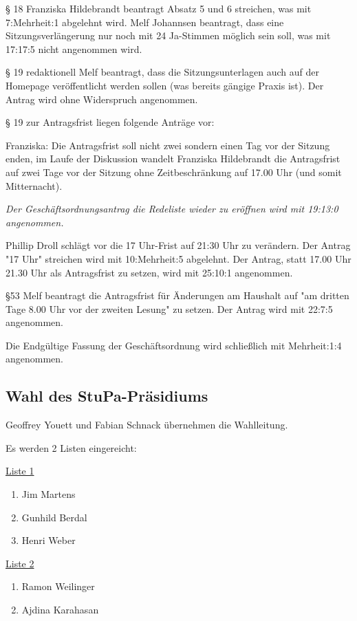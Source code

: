 \documentclass[ngerman,headheight=70pt]{scrartcl}
\begin{document}
    § 18  Franziska Hildebrandt beantragt Absatz 5 und 6 streichen, was mit
    7:Mehrheit:1 abgelehnt wird.
    Melf Johannsen beantragt, dass eine Sitzungsverlängerung nur noch mit 24
    Ja-Stimmen möglich sein soll, was mit 17:17:5 nicht angenommen wird.

    § 19 redaktionell Melf beantragt, dass die Sitzungsunterlagen auch auf der
    Homepage veröffentlicht werden sollen (was bereits gängige Praxis ist). Der
    Antrag wird ohne Widerspruch angenommen.

    § 19 zur Antragsfrist liegen folgende Anträge vor:

    Franziska: Die Antragsfrist soll nicht zwei sondern einen Tag vor der Sitzung
    enden, im Laufe der Diskussion wandelt Franziska Hildebrandt die Antragsfrist
    auf zwei Tage vor der Sitzung ohne Zeitbeschränkung auf 17.00 Uhr (und
    somit Mitternacht).

    \textit{Der Geschäftsordnungsantrag die Redeliste wieder zu eröffnen wird mit
    19:13:0 angenommen.}

    Phillip Droll schlägt vor die 17 Uhr-Frist auf 21:30 Uhr zu verändern.
    Der Antrag "17 Uhr" streichen wird mit 10:Mehrheit:5 abgelehnt.
    Der Antrag, statt 17.00 Uhr 21.30 Uhr als Antragsfrist zu setzen, wird mit
    25:10:1 angenommen.

    §53 Melf beantragt die Antragsfrist für Änderungen am Haushalt auf
    "am dritten Tage 8.00 Uhr vor der zweiten Lesung" zu setzen. Der Antrag wird
    mit 22:7:5 angenommen.

    Die Endgültige Fassung der Geschäftsordnung wird schließlich mit
    Mehrheit:1:4 angenommen.

    \subsection{Wahl des StuPa-Präsidiums}

    Geoffrey Youett und Fabian Schnack übernehmen die Wahlleitung.

    Es werden 2 Listen eingereicht:

    \underline{Liste 1}
    \begin{enumerate}
        \item Jim Martens
        \item Gunhild Berdal
        \item Henri Weber
    \end{enumerate}

    \underline{Liste 2}
    \begin{enumerate}
        \item Ramon Weilinger
        \item Ajdina Karahasan
    \end{enumerate}
\end{document}
